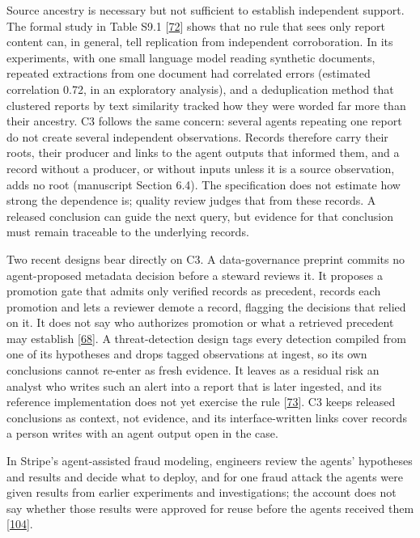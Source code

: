 \documentclass[
  11pt,
]{article}
\begin{document}
Source ancestry is necessary but not sufficient to establish independent
support. The formal study in Table S9.1
{[}\protect\hyperlink{ref-Bara2026EpistemicSybil}{72}{]} shows that no
rule that sees only report content can, in general, tell replication
from independent corroboration. In its experiments, with one small
language model reading synthetic documents, repeated extractions from
one document had correlated errors (estimated correlation 0.72, in an
exploratory analysis), and a deduplication method that clustered reports
by text similarity tracked how they were worded far more than their
ancestry. C3 follows the same concern: several agents repeating one
report do not create several independent observations. Records therefore
carry their roots, their producer and links to the agent outputs that
informed them, and a record without a producer, or without inputs unless
it is a source observation, adds no root (manuscript Section 6.4). The
specification does not estimate how strong the dependence is; quality
review judges that from these records. A released conclusion can guide
the next query, but evidence for that conclusion must remain traceable
to the underlying records.

Two recent designs bear directly on C3. A data-governance preprint
commits no agent-proposed metadata decision before a steward reviews it.
It proposes a promotion gate that admits only verified records as
precedent, records each promotion and lets a reviewer demote a record,
flagging the decisions that relied on it. It does not say who authorizes
promotion or what a retrieved precedent may establish
{[}\protect\hyperlink{ref-Akhtar2026Contestable}{68}{]}. A
threat-detection design tags every detection compiled from one of its
hypotheses and drops tagged observations at ingest, so its own
conclusions cannot re-enter as fresh evidence. It leaves as a residual
risk an analyst who writes such an alert into a report that is later
ingested, and its reference implementation does not yet exercise the
rule {[}\protect\hyperlink{ref-Evron2026AdversaryBrains}{73}{]}. C3
keeps released conclusions as context, not evidence, and its
interface-written links cover records a person writes with an agent
output open in the case.

In Stripe's agent-assisted fraud modeling, engineers review the agents'
hypotheses and results and decide what to deploy, and for one fraud
attack the agents were given results from earlier experiments and
investigations; the account does not say whether those results were
approved for reuse before the agents received them
{[}\protect\hyperlink{ref-Drapeau2026ScalingRadar}{104}{]}.
\end{document}
